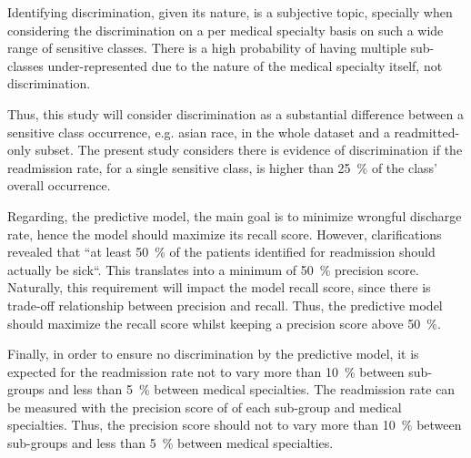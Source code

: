 \documentclass[a4paper,11pt]{article}
\begin{document}
Identifying discrimination, given its nature, is a subjective topic, specially when considering the discrimination on a per medical specialty basis on such a wide range of sensitive classes. There is a high probability of having multiple sub-classes under-represented due to the nature of the medical specialty itself, not discrimination.

Thus, this study will consider discrimination as a  substantial  difference  between a  sensitive  class occurrence, e.g. asian race, in the whole dataset and a readmitted-only subset. The present study considers there is evidence of discrimination if the readmission rate, for a single sensitive class, is higher than \SI{25}{\percent} of the class' overall occurrence.

Regarding, the predictive model, the main goal is to minimize wrongful discharge rate, hence the model should maximize its recall score. However, clarifications revealed that ``at least \SI{50}{\percent} of the patients identified for readmission should actually be sick``. This translates into a minimum of \SI{50}{\percent} precision score. Naturally, this requirement will impact the model recall score, since there is trade-off relationship between precision and recall. Thus, the predictive model should maximize the recall score whilst keeping a precision score above \SI{50}{\percent}.

Finally, in order to ensure no discrimination by the predictive model, it is expected for the readmission rate not to vary more than \SI{10}{\percent} between sub-groups and less than \SI{5}{\percent} between medical specialties. The readmission rate can be measured with the precision score of of each sub-group and medical specialties. Thus, 
the precision score should not to vary more than \SI{10}{\percent} between sub-groups and less than \SI{5}{\percent} between medical specialties.



\end{document}
